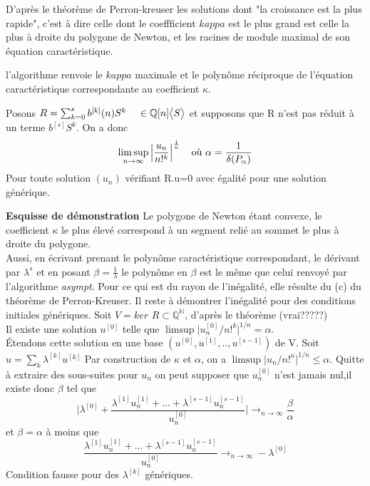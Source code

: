 \documentclass[a4paper,10.5pt]{article}
\begin{document}
	\noindent D'après le théorème de Perron-kreuser les solutions dont "la croissance est la plus rapide", c'est à dire celle dont le coeffficient $kappa$ est le plus grand est celle la plus à droite du polygone de Newton, et les racines de module maximal de son équation caractéristique.
	
	l'algorithme renvoie le $kappa$ maximale et le polynôme réciproque de l'équation caractéristique correspondante au coefficient $\kappa$.
	
	\begin{proposition} Posons $R=\sum_{k=0}^{s} b^{[k]}(n)S^{k} \hspace{4mm} \in \mathbb{Q}[n]\big<S\big>$ et supposons que R n'est pas réduit à un terme $b^{[s]}S^{k}$. On a donc
		\[\limsup_{n \rightarrow \infty }\Big|\frac{u_{n}}{n!^{k}}\Big|^{\frac{1}{n}} \hspace{4mm} \text{où } \alpha=\frac{1}{\delta(P_{\alpha})}\]
		Pour toute solution $(u_{n})$ vérifiant R.u=0 avec égalité pour une solution générique. 
	\end{proposition}
	\textbf{Esquisse de démonstration}
	Le polygone de Newton étant convexe, le coefficient $\kappa$ le plus élevé correspond à un segment relié au sommet le plus à droite du polygone.\\
	Aussi, en écrivant prenant le polynôme caractéristique correspondant, le dérivant par $\lambda^{s}$ et en posant $\beta=\frac{1}{\lambda}$ le polynôme en $\beta$ est le même que celui renvoyé par l'algorithme \textit{asympt}. Pour ce qui est du rayon de l'inégalité, elle résulte du (c) du théorème de Perron-Kreuser.
	Il reste à démontrer l'inégalité pour des conditions initiales génériques. Soit $V=ker$ $R \subset \mathbb{Q}^{\mathbb{N}}$, d'après le théorème (vrai?????)\\
	Il existe une solution $u^{[0]}$ telle que $\limsup \big|u^{[0]}_{n}/n!^{k}\big|^{1/n}=\alpha$.\\
	Étendons cette solution en une base $(u^{[0]},u^{[1]},..,u^{[s-1]})$ de V. Soit $u=\sum_{k}\lambda^{[k]}u^{[k]}$
	Par construction de $\kappa$ et $\alpha$, on a $\limsup \big|u_{n}/n!^{\kappa}\big|^{1/n} \leq \alpha$. Quitte à extraire des sous-suites pour $u_{n}$ on peut supposer que $u^{[0]}_{n}$ n'est jamais nul,il existe donc $\beta$ tel que
	\[\Big|\lambda^{[0]}+\frac{\lambda^{[1]}u^{[1]}_{n}+...+\lambda^{[s-1]}u^{[s-1]}_{n}}{u^{[0]}_{n}}\Big| \rightarrow_{n \rightarrow \infty} \frac{\beta}{\alpha}\] 
	et $\beta=\alpha$ à moins que 
	\[\frac{\lambda^{[1]}u^{[1]}_{n}+...+\lambda^{[s-1]}u^{[s-1]}_{n}}{u^{[0]}_{n}}\rightarrow_{n \rightarrow \infty}-\lambda^{[0]}\]
	Condition fausse pour des $\lambda^{[k]}$ génériques.
	
\end{document}
